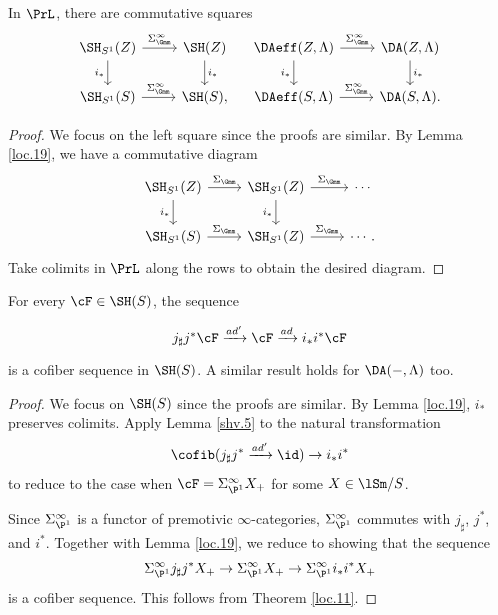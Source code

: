 \documentclass[10pt]{amsart}
\begin{document}
\begin{lem}
\label{loc.19}
In $\PrL$, there are commutative squares
\[
\begin{tikzcd}
\SH_{S^1}(Z)\ar[d,"i_*"']\ar[r,"\Sigma_{\Gmm}^\infty"]&
\SH(Z)\ar[d,"i_*"]
\\
\SH_{S^1}(S)\ar[r,"\Sigma_{\Gmm}^\infty"]&
\SH(S),
\end{tikzcd}
\quad
\begin{tikzcd}
\DAeff(Z,\Lambda)\ar[d,"i_*"']\ar[r,"\Sigma_{\Gmm}^\infty"]&
\DA(Z,\Lambda)\ar[d,"i_*"]
\\
\DAeff(S,\Lambda)\ar[r,"\Sigma_{\Gmm}^\infty"]&
\DA(S,\Lambda).
\end{tikzcd}
\]
\end{lem}
\begin{proof}
We focus on the left square since the proofs are similar.
By Lemma \ref{loc.19}, we have a commutative diagram
\[
\begin{tikzcd}
\SH_{S^1}(Z)\ar[d,"i_*"']\ar[r,"\Sigma_{\Gmm}"]&
\SH_{S^1}(Z)\ar[d,"i_*"']\ar[r,"\Sigma_{\Gmm}"]&
\cdots
\\
\SH_{S^1}(S)\ar[r,"\Sigma_{\Gmm}"]&
\SH_{S^1}(Z)\ar[r,"\Sigma_{\Gmm}"]&
\cdots.
\end{tikzcd}
\]
Take colimits in $\PrL$ along the rows to obtain the desired diagram.
\end{proof}


\begin{thm}
\label{loc.16}
For every $\cF\in \SH(S)$, the sequence
\begin{equation}
\label{loc.16.1}
\begin{tikzcd}
j_\sharp j^* \cF
\xrightarrow{ad'}
\cF
\xrightarrow{ad}
i_*i^*\cF
\end{tikzcd}
\end{equation}
is a cofiber sequence in $\SH(S)$.
A similar result holds for $\DA(-,\Lambda)$ too.
\end{thm}
\begin{proof}
We focus on $\SH(S)$ since the proofs are similar.
By Lemma \ref{loc.19}, $i_*$ preserves colimits.
Apply Lemma \ref{shv.5} to the natural transformation
\[
\cofib(j_\sharp j^*\xrightarrow{ad'}\id)
\to
i_*i^*
\]
to reduce to the case when $\cF=\Sigma_{\P^1}^\infty X_+$ for some $X\in \lSm/S$.

Since $\Sigma_{\P^1}^\infty$ is a functor of premotivic $\infty$-categories, $\Sigma_{\P^1}^\infty$ commutes with $j_\sharp$, $j^*$, and $i^*$.
Together with Lemma \ref{loc.19}, we reduce to showing that the sequence
\[
\Sigma_{\P^1}^\infty j_\sharp j^* X_+
\to
\Sigma_{\P^1}^\infty  X_+
\to
\Sigma_{\P^1}^\infty i_*i^* X_+
\]
is a cofiber sequence.
This follows from Theorem \ref{loc.11}.
\end{proof}
\end{document}
